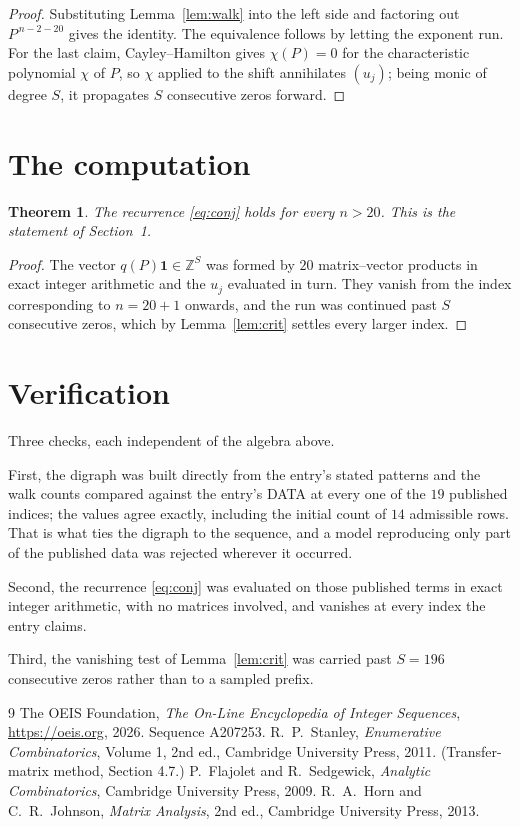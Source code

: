 \documentclass[11pt,a4paper]{article}
\theoremstyle{plain}
\newtheorem{theorem}{Theorem}
\theoremstyle{definition}
\begin{document}
\begin{proof}
Substituting Lemma~\ref{lem:walk} into the left side and factoring out
$P^{\,n-2-20}$ gives the identity. The equivalence follows by letting the exponent
run. For the last claim, Cayley--Hamilton gives $\chi(P)=0$ for the characteristic
polynomial $\chi$ of $P$, so $\chi$ applied to the shift annihilates $(u_j)$; being monic of
degree $S$, it propagates $S$ consecutive zeros forward.
\end{proof}

\section{The computation}

\begin{theorem}
The recurrence \eqref{eq:conj} holds for every $n>20$. This is the statement of
Section~1.
\end{theorem}

\begin{proof}
The vector $q(P)\mathbf{1}\in\mathbb{Z}^{S}$ was formed by $20$ matrix--vector
products in exact integer arithmetic and the $u_j$ evaluated in turn. They vanish from the
index corresponding to $n=20+1$ onwards, and the run was continued past $S$ consecutive
zeros, which by Lemma~\ref{lem:crit} settles every larger index.
\end{proof}

\section{Verification}

Three checks, each independent of the algebra above.

First, the digraph was built directly from the entry's stated patterns and the walk counts
compared against the entry's DATA at every one of the $19$ published indices; the
values agree exactly, including the initial count of $14$ admissible rows. That is
what ties the digraph to the sequence, and a model reproducing only part of the published
data was rejected wherever it occurred.

Second, the recurrence \eqref{eq:conj} was evaluated on those published terms in exact
integer arithmetic, with no matrices involved, and vanishes at every index the entry claims.

Third, the vanishing test of Lemma~\ref{lem:crit} was carried past $S=196$ consecutive
zeros rather than to a sampled prefix.

\begin{thebibliography}{9}
 The OEIS Foundation, \emph{The On-Line Encyclopedia of Integer
Sequences}, \url{https://oeis.org}, 2026. Sequence A207253.
 R.~P.~Stanley, \emph{Enumerative Combinatorics}, Volume 1, 2nd ed.,
Cambridge University Press, 2011. (Transfer-matrix method, Section 4.7.)
 P.~Flajolet and R.~Sedgewick, \emph{Analytic Combinatorics}, Cambridge
University Press, 2009.
 R.~A.~Horn and C.~R.~Johnson, \emph{Matrix Analysis}, 2nd ed., Cambridge
University Press, 2013.
\end{thebibliography}
\end{document}

